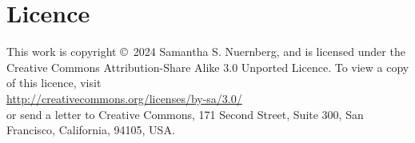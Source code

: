\chapter*{Licence}

This work is copyright \copyright \ 2024 Samantha S. Nuernberg, and is licensed
under the Creative Commons Attribution-Share Alike 3.0 Unported
Licence. To view a copy of this licence, visit \\
\url{http://creativecommons.org/licenses/by-sa/3.0/} \\
or send a letter to Creative Commons, 171 Second Street, Suite 300,
San Francisco, California, 94105, USA.

\begin{center}


\end{center}
